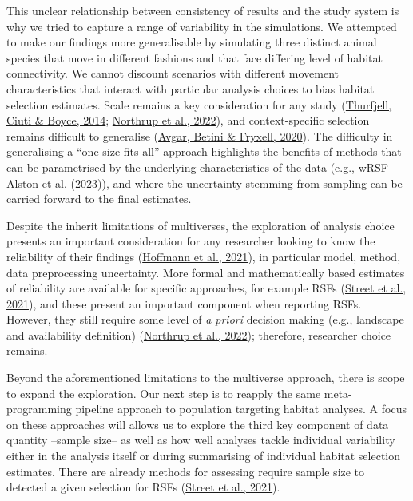 \documentclass[10pt,a4paper]{article}
\begin{document}
This unclear relationship between consistency of results and the study system is why we tried to capture a range of variability in the simulations.
We attempted to make our findings more generalisable by simulating three distinct animal species that move in different fashions and that face differing level of habitat connectivity.
We cannot discount scenarios with different movement characteristics that interact with particular analysis choices to bias habitat selection estimates.
Scale remains a key consideration for any study (\protect\hyperlink{ref-thurfjell_applications_2014}{Thurfjell, Ciuti \& Boyce, 2014}; \protect\hyperlink{ref-northrup_conceptual_2022}{Northrup et al., 2022}), and context-specific selection remains difficult to generalise (\protect\hyperlink{ref-avgar_habitat_2020}{Avgar, Betini \& Fryxell, 2020}).
The difficulty in generalising a ``one-size fits all'' approach highlights the benefits of methods that can be parametrised by the underlying characteristics of the data (e.g., wRSF Alston et al. (\protect\hyperlink{ref-alston_mitigating_2023}{2023})), and where the uncertainty stemming from sampling can be carried forward to the final estimates.

Despite the inherit limitations of multiverses, the exploration of analysis choice presents an important consideration for any researcher looking to know the reliability of their findings (\protect\hyperlink{ref-hoffmann_multiplicity_2021}{Hoffmann et al., 2021}), in particular model, method, data preprocessing uncertainty.
More formal and mathematically based estimates of reliability are available for specific approaches, for example RSFs (\protect\hyperlink{ref-street_solving_2021}{Street et al., 2021}), and these present an important component when reporting RSFs.
However, they still require some level of \emph{a priori} decision making (e.g., landscape and availability definition) (\protect\hyperlink{ref-northrup_conceptual_2022}{Northrup et al., 2022}); therefore, researcher choice remains.

Beyond the aforementioned limitations to the multiverse approach, there is scope to expand the exploration.
Our next step is to reapply the same meta-programming pipeline approach to population targeting habitat analyses.
A focus on these approaches will allows us to explore the third key component of data quantity --sample size-- as well as how well analyses tackle individual variability either in the analysis itself or during summarising of individual habitat selection estimates.
There are already methods for assessing require sample size to detected a given selection for RSFs (\protect\hyperlink{ref-street_solving_2021}{Street et al., 2021}).
\end{document}
